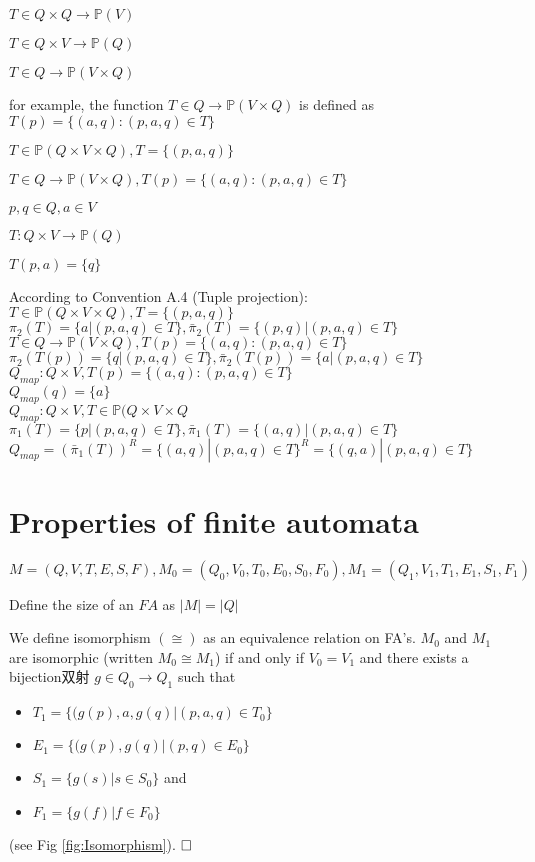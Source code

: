 $T \in Q\times Q \to \mathbb{P}(V)$

$T \in Q \times V \to \mathbb{P}(Q)$

$T \in Q \to \mathbb{P}(V \times Q)$

for example, the function $T \in Q \to \mathbb{P}(V \times Q)$ is defined as $T(p) = \{(a,q):(p,a,q) \in T\}$


\hfill

$T \in \mathbb{P}(Q \times V \times Q), T = \{(p,a,q) \}$

$T\in Q \to \mathbb{P}(V\times Q), T(p) = \{(a,q):(p,a,q) \in T\}$

\hfill

$p,q\in Q, a\in V$

$T:Q\times V\to \mathbb{P}(Q)$

$T(p,a)=\{q\}$


\hfill

According to Convention A.4 (Tuple projection):\\
$T \in \mathbb{P}(Q \times V \times Q), T = \{(p,a,q) \}$\\
$\pi_2(T)=\{a|(p,a,q)\in T\}, \bar{\pi}_2(T)=\{(p,q)|(p,a,q)\in T\}$\\
$T\in Q \to \mathbb{P}(V\times Q), T(p) = \{(a,q):(p,a,q) \in T\}$\\
$\pi_2(T(p))=\{q|(p,a,q)\in T\}, \bar{\pi}_2(T(p))=\{a|(p,a,q)\in T\}$\\
$Q_{map}:Q\times V,T(p) = \{(a,q):(p,a,q) \in T\}$\\
$Q_{map}(q)=\{a\}$\\
$Q_{map}:Q\times V,T \in \mathbb{P}(Q \times V \times Q$\\
$\pi_1(T)=\{p|(p,a,q)\in T\}, \bar{\pi}_1(T)=\{(a,q)|(p,a,q)\in T\}$\\
$Q_{map}=(\bar{\pi}_1(T))^R=\{(a,q)|(p,a,q)\in T\}^R=\{(q,a)|(p,a,q)\in T\}$


\section{Properties of finite automata}

$M=(Q,V,T,E,S,F),M_0=(Q_0,V_0,T_0,E_0,S_0,F_0),M_1=(Q_1,V_1,T_1,E_1,S_1,F_1)$

\begin{definition}[Size of an $FA$] 
	Define the size of an $FA$ as $|M|=|Q|$
\end{definition}

\begin{definition}
	We define isomorphism $(\cong)$ as an equivalence relation on FA's. $M_0$ and $M_1$ are isomorphic (written $M_0\cong M_1$) if and only if $V_0=V_1$ and there exists a bijection双射 $g\in Q_0\to Q_1$ such that
	\begin{itemize}
		\item $T_1=\{(g(p),a,g(q)|(p,a,q)\in T_0\}$
		\item $E_1=\{(g(p),g(q)|(p,q)\in E_0\}$
		\item $S_1=\{g(s)|s\in S_0\}$ and
		\item $F_1=\{g(f)|f\in F_0\}$
	\end{itemize} (see Fig \ref{fig:Isomorphism}). $\hfill\square$
\end{definition}

